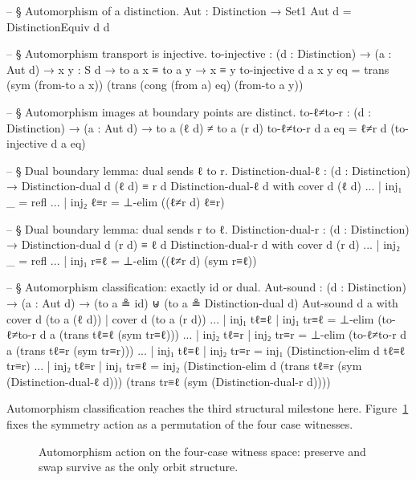 \documentclass[11pt,a4paper]{book}
\begin{document}
\begin{code}
-- § Automorphism of a distinction.
Aut : Distinction → Set1
Aut d = DistinctionEquiv d d

-- § Automorphism transport is injective.
to-injective : (d : Distinction) → (a : Aut d) → {x y : S d} → to a x ≡ to a y → x ≡ y
to-injective d a {x} {y} eq =
  trans (sym (from-to a x)) (trans (cong (from a) eq) (from-to a y))

-- § Automorphism images at boundary points are distinct.
to-ℓ≠to-r : (d : Distinction) → (a : Aut d) → to a (ℓ d) ≠ to a (r d)
to-ℓ≠to-r d a eq = ℓ≠r d (to-injective d a eq)

-- § Dual boundary lemma: dual sends ℓ to r.
Distinction-dual-ℓ : (d : Distinction) → Distinction-dual d (ℓ d) ≡ r d
Distinction-dual-ℓ d with cover d (ℓ d)
... | inj₁ _      = refl
... | inj₂ ℓ≡r    = ⊥-elim ((ℓ≠r d) ℓ≡r)

-- § Dual boundary lemma: dual sends r to ℓ.
Distinction-dual-r : (d : Distinction) → Distinction-dual d (r d) ≡ ℓ d
Distinction-dual-r d with cover d (r d)
... | inj₂ _      = refl
... | inj₁ r≡ℓ    = ⊥-elim ((ℓ≠r d) (sym r≡ℓ))

-- § Automorphism classification: exactly id or dual.
Aut-sound :
  (d : Distinction) →
  (a : Aut d) →
  (to a ≗ id) ⊎ (to a ≗ Distinction-dual d)
Aut-sound d a with cover d (to a (ℓ d)) | cover d (to a (r d))
... | inj₁ tℓ≡ℓ | inj₁ tr≡ℓ = ⊥-elim (to-ℓ≠to-r d a (trans tℓ≡ℓ (sym tr≡ℓ)))
... | inj₂ tℓ≡r | inj₂ tr≡r = ⊥-elim (to-ℓ≠to-r d a (trans tℓ≡r (sym tr≡r)))
... | inj₁ tℓ≡ℓ | inj₂ tr≡r =
  inj₁ (Distinction-elim d tℓ≡ℓ tr≡r)
... | inj₂ tℓ≡r | inj₁ tr≡ℓ =
  inj₂ (Distinction-elim d
    (trans tℓ≡r (sym (Distinction-dual-ℓ d)))
    (trans tr≡ℓ (sym (Distinction-dual-r d))))
\end{code}

Automorphism classification reaches the third structural milestone here. Figure~\ref{fig:k4-orbits} fixes the symmetry action as a permutation of the four case witnesses.

\begin{figure}[h]
\centering
{}
\caption{Automorphism action on the four-case witness space: preserve and swap survive as the only orbit structure.}
\label{fig:k4-orbits}
\end{figure}
\end{document}

